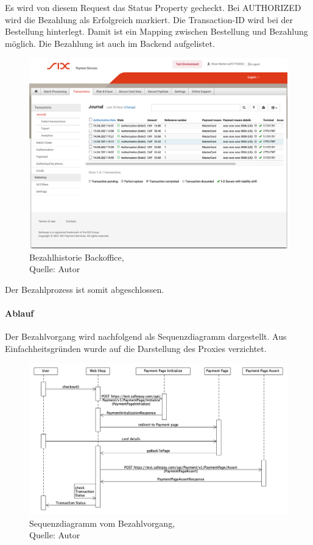 Es wird von diesem Request das Status Property gecheckt. Bei AUTHORIZED wird die Bezahlung als Erfolgreich markiert. Die Transaction-ID wird bei der Bestellung hinterlegt. Damit ist ein Mapping zwischen Bestellung und Bezahlung möglich. Die Bezahlung ist auch im Backend aufgelistet. 
\begin{figure}[H]
	\centering
	\includegraphics[width=1\textwidth]{images/paymentsBackoffice.PNG}
	\caption[Bezahlhistorie Backoffice]{Bezahlhistorie Backoffice,\\ Quelle: Autor}
	\label{img: paymentsBackoffice}
\end{figure} 

Der Bezahlprozess ist somit abgeschlossen. 

\paragraph{Ablauf}
Der Bezahlvorgang wird nachfolgend als Sequenzdiagramm dargestellt. Aus Einfachheitsgründen wurde auf die Darstellung des Proxies verzichtet. 
\begin{figure}[H]
	\centering
	\includegraphics[width=1\textwidth]{images/paymentSequence.PNG}
	\caption[Sequenzdiagramm vom Bezahlvorgang]{Sequenzdiagramm vom Bezahlvorgang,\\ Quelle: Autor}
	\label{img: paymentSequence}
\end{figure} 

